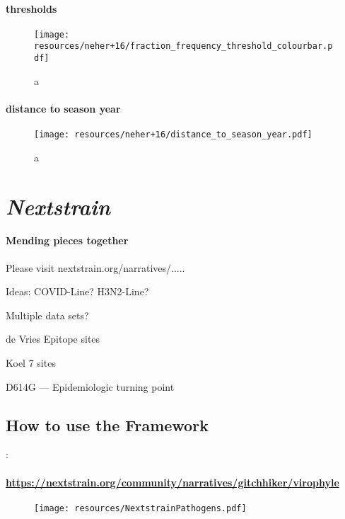 \documentclass{beamer}
\begin{document}
\begin{darkframes}
    \begin{frame}{\subsecname}
      \framesubtitle{thresholds}
      \begin{figure}
        \texttt{[image: resources/neher+16/fraction\_frequency\_threshold\_colourbar.pdf]}
        \caption{\footnotesize a}
      \end{figure}
    \end{frame}

    \begin{frame}{\subsecname}
      \framesubtitle{distance to season year}
      \begin{figure}
        \texttt{[image: resources/neher+16/distance\_to\_season\_year.pdf]}
        \caption{\footnotesize a}
      \end{figure}
    \end{frame}










  \section{\textit{Nextstrain}}

    \begin{frame}{\secname}
      \framesubtitle{Mending pieces together}
      Please visit nextstrain.org/narratives/.....

      Ideas: COVID-Line? H3N2-Line?

      Multiple data sets?

      de Vries Epitope sites

      Koel 7 sites

      D614G --- Epidemiologic turning point
    \end{frame}

    \subsection{How to use the Framework}
    \begin{frame}{\secname : \subsecname}
      \framesubtitle{\href{URL}{https://nextstrain.org/community/narratives/gitchhiker/virophyle}}
      \begin{figure}
        \texttt{[image: resources/NextstrainPathogens.pdf]}
        \caption{\footnotesize }
      \end{figure}
    \end{frame}


\end{darkframes}
\end{document}
